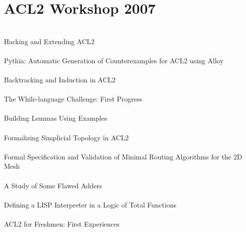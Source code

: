 \documentclass{article}
\begin{document}
\section{ACL2 Workshop 2007}

\cite{07-dillinger-hacking} \\
Hacking and Extending {ACL2} \\

\cite{07-spiridonov-pythia} \\
{Pythia:} Automatic Generation of Counterexamples for {ACL2} using {Alloy} \\

\cite{07-erickson-backtracking} \\
Backtracking and Induction in {ACL2} \\

\cite{07-cowles-challenge} \\
The While-language Challenge: First Progress \\

\cite{07-infante-lopez-examples} \\
Building Lemmas Using Examples \\

\cite{07-andres-topology} \\
Formalizing Simplicial Topology in {ACL2} \\

\cite{07-schmaltz-routing} \\
Formal Specification and Validation of Minimal Routing Algorithms for the {2D} Mesh \\

\cite{07-hunt-adders} \\
A Study of Some Flawed Adders \\

\cite{07-gordon-interpreter} \\
Defining a {LISP} Interpreter in a Logic of Total Functions \\

\cite{07-eastlund-freshmen} \\
{ACL2} for Freshmen: First Experiences \\
\end{document}

